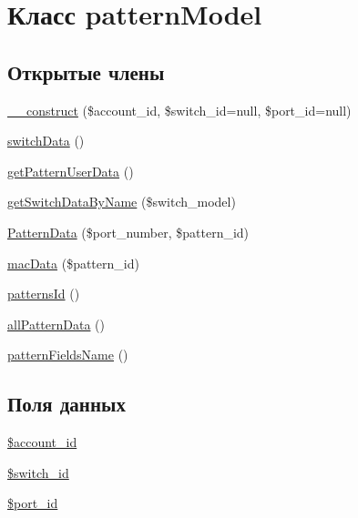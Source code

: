 \hypertarget{classpattern_model}{\section{Класс pattern\-Model}
\label{classpattern_model}
}
\subsection*{Открытые члены}
\begin{DoxyCompactItemize}
\item 
\hyperlink{classpattern_model_acd9a441bfafa2736b0f22fbcafd4aa11}{\-\_\-\-\_\-construct} (\$account\-\_\-id, \$switch\-\_\-id=null, \$port\-\_\-id=null)
\item 
\hyperlink{classpattern_model_a4f92dd070690a6c938d15a9363065351}{switch\-Data} ()
\item 
\hyperlink{classpattern_model_a12a4b27a766b5c4573d24e255d1ef5a4}{get\-Pattern\-User\-Data} ()
\item 
\hyperlink{classpattern_model_a09178e2c290bc2f245d68dee701abc98}{get\-Switch\-Data\-By\-Name} (\$switch\-\_\-model)
\item 
\hyperlink{classpattern_model_a5c106765af75e3a68d2191cdc2d784f3}{Pattern\-Data} (\$port\-\_\-number, \$pattern\-\_\-id)
\item 
\hyperlink{classpattern_model_a31f25239e28e31eb5baa5ab4564675b8}{mac\-Data} (\$pattern\-\_\-id)
\item 
\hyperlink{classpattern_model_a9357b7ece76ca9a3a0545ca2eed53337}{patterns\-Id} ()
\item 
\hyperlink{classpattern_model_ab6c490cb514eb20314b45d8e0c2a6eb5}{all\-Pattern\-Data} ()
\item 
\hyperlink{classpattern_model_aa54e17bfa130c8e51d650aa8e73d0780}{pattern\-Fields\-Name} ()
\end{DoxyCompactItemize}
\subsection*{Поля данных}
\begin{DoxyCompactItemize}
\item 
\hyperlink{classpattern_model_a7c3eb7a98818df12bc88e63ac7ea9c63}{\$account\-\_\-id}
\item 
\hyperlink{classpattern_model_a21ec74990029279615d417ec27831ccf}{\$switch\-\_\-id}
\item 
\hyperlink{classpattern_model_ad8662b1c3f632fb3bf4b108a062b7474}{\$port\-\_\-id}
\end{DoxyCompactItemize}


